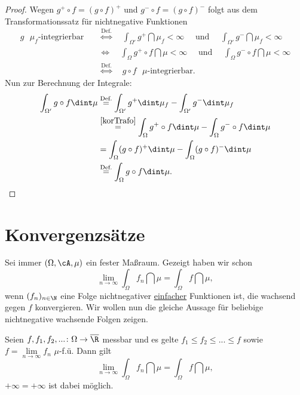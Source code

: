 \begin{proof}
	Wegen $g^+ \circ f = (g \circ f)^+$ und $g^- \circ f = (g \circ f)^-$ folgt aus dem Transformationssatz f\"ur nichtnegative Funktionen
	\begin{align*}
		g \text{ $\mu_f$-integrierbar} \quad & \overset{\text{Def.}}{\Leftrightarrow} \quad \int_{\Omega'} g^+ \dint \mu_f < \infty\quad \text{ und }\quad \int_{\Omega'} g^- \dint \mu_f < \infty\\ 
		&\Leftrightarrow  \quad\int_{\Omega} g^+ \circ f \dint \mu < \infty\quad \text{ und }\quad \int_{\Omega} g^- \circ f \dint \mu < \infty\\
		&\overset{\text{Def.}}{ \Leftrightarrow} \quad g \circ f \text{ $\mu$-integrierbar}.
	\end{align*}
	Nun zur Berechnung der Integrale:
	 \begin{align*}
		\int_{\Omega'} g \circ f \dint \mu&\overset{\text{Def.}}{=} \int_{\Omega'} g^+ \dint \mu_f - \int_{\Omega'} g^- \dint \mu_f\\
		& \overset{\ref{korTrafo}}{=} \int_{\Omega} g^+ \circ f \dint \mu - \int_{\Omega} g^- \circ f \dint \mu\\
		&=\int_{\Omega} (g \circ f)^+ \dint \mu - \int_{\Omega} (g \circ f)^- \dint \mu\\
		& \overset{\text{Def.}} {=}\int_{\Omega} g \circ f \dint \mu.
	\end{align*}
\end{proof}

\section{Konvergenzsätze}

Sei immer $(\Omega, \cA, \mu)$ ein fester Maßraum. Gezeigt haben wir schon \[ \lim_{n\to\infty}\int_{\Omega} f_n \dint \mu = \int_{\Omega} f \dint \mu, \]
wenn $(f_n)_{n\in\N}$ eine Folge nichtnegativer \underline{einfacher} Funktionen ist, die wachsend gegen $f$ konvergieren. Wir wollen nun die gleiche Aussage f\"ur beliebige nichtnegative wachsende Folgen zeigen.

\begin{satz}\label{allgMonKonv}
	Seien $f,f_1,f_2,...\colon \Omega \to \overline{\R}$ messbar und es gelte $f_1 \leq f_2 \leq ... \leq f$ sowie $f = \lim\limits_{n \to \infty} f_n$ $\mu$-f.\"u. Dann gilt \[ \lim\limits_{n \to \infty} \int_{\Omega} f_n \dint \mu=\int_{\Omega} f \dint \mu, \]
	$+\infty=+\infty$ ist dabei m\"oglich.
\end{satz}

